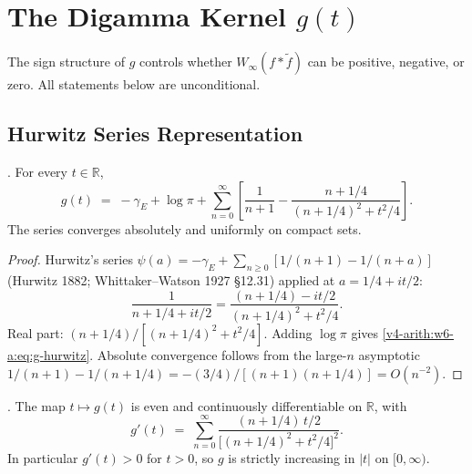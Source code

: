 \section{The Digamma Kernel \(g(t)\)}
\label{v4-arith:w6-a:digamma-kernel}

The sign structure of \(g\) controls whether
\(W_{\infty}(f*\widetilde{f})\) can be positive, negative, or zero.
All statements below are unconditional.

\subsection{Hurwitz Series Representation}
\label{v4-arith:w6-a:digamma-kernel:hurwitz}

\begin{lemma}
\label{v4-arith:w6-a:lem:g-hurwitz}
\ClaimStatusProvedHere. For every \(t\in\mathbb{R}\),
\begin{equation}
\label{v4-arith:w6-a:eq:g-hurwitz}
g(t)\;=\;-\gamma_{E}+\log\pi+\sum_{n=0}^{\infty}\!\left[\frac{1}{n+1}-\frac{n+1/4}{(n+1/4)^{2}+t^{2}/4}\right].
\end{equation}
The series converges absolutely and uniformly on compact sets.
\end{lemma}

\begin{proof}
Hurwitz's series
\(\psi(a)=-\gamma_{E}+\sum_{n\geq 0}[1/(n+1)-1/(n+a)]\) (Hurwitz 1882;
Whittaker--Watson 1927 \S12.31) applied at \(a=1/4+it/2\):
\[
\frac{1}{n+1/4+it/2}=\frac{(n+1/4)-it/2}{(n+1/4)^{2}+t^{2}/4}.
\]
Real part: \((n+1/4)/[(n+1/4)^{2}+t^{2}/4]\). Adding \(\log\pi\) gives
\eqref{v4-arith:w6-a:eq:g-hurwitz}. Absolute convergence follows from
the large-\(n\) asymptotic
\(1/(n+1)-1/(n+1/4)=-(3/4)/[(n+1)(n+1/4)]=O(n^{-2})\).
\end{proof}

\begin{lemma}
\label{v4-arith:w6-a:lem:g-monotone}
\ClaimStatusProvedHere. The map \(t\mapsto g(t)\) is even and
continuously differentiable on \(\mathbb{R}\), with
\begin{equation}
\label{v4-arith:w6-a:eq:g-derivative}
g'(t)\;=\;\sum_{n=0}^{\infty}\frac{(n+1/4)\,t/2}{\bigl[(n+1/4)^{2}+t^{2}/4\bigr]^{2}}.
\end{equation}
In particular \(g'(t)>0\) for \(t>0\), so \(g\) is strictly increasing in
\(|t|\) on \([0,\infty)\).
\end{lemma}

